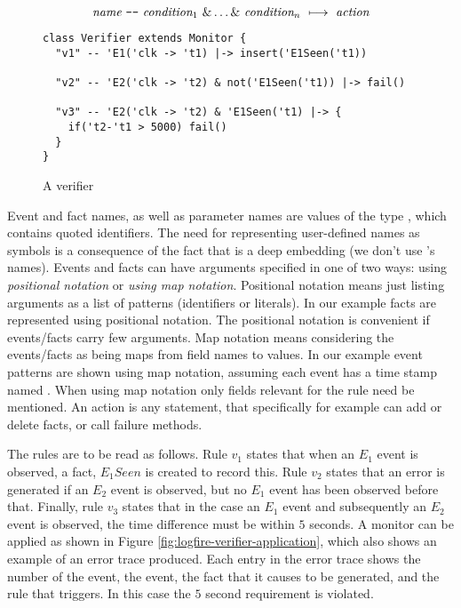 \[
  \textit{name}\ \verb+--+\ \textit{condition}_1\ \& \ldots \&\ \textit{condition}_n\ \longmapsto\  \textit{action}
\]

\begin{figure}[t]
\begin{small}
\begin{framed}
\sscala
\begin{lstlisting}
class Verifier extends Monitor {
  "v1" -- 'E1('clk -> 't1) |-> insert('E1Seen('t1))

  "v2" -- 'E2('clk -> 't2) & not('E1Seen('t1)) |-> fail()
  
  "v3" -- 'E2('clk -> 't2) & 'E1Seen('t1) |-> {
    if('t2-'t1 > 5000) fail()
  }
}
\end{lstlisting}
\end{framed}
\end{small}
\caption{A \logfire{} verifier}
\label{fig:logfire-verifier}
\end{figure}

Event and fact names, as well as parameter names are values of the
\scala{} type , which contains quoted identifiers.  The
need for representing user-defined names as symbols is a consequence
of the fact that \logfire{} is a deep embedding (we don't use
\scala{}'s names). 
%
Events and facts can have arguments specified in one of two ways:
using {\em positional notation} or {\em using map notation}\label{page:mapnotation}. 
Positional notation means
just listing arguments as a list of patterns (identifiers or literals). In our
example facts are represented using positional notation. 
The positional notation is convenient if events/facts carry few arguments. 
%
Map notation means considering the events/facts as being maps from field names to values. 
In our example event patterns are shown using map notation, assuming each event has a time stamp named . When using map notation only fields relevant for the rule need be mentioned. An action is any \scala{} statement, that specifically for example can add or delete facts, or call failure methods.

The rules are to be read as follows. Rule $v_1$ states that when an $E_1$ event
is observed, a fact, $E_1Seen$ is created to record this. Rule $v_2$ states that an error is generated if an $E_2$ event is observed, but no $E_1$ event has been observed before that. Finally, rule $v_3$ states that in the case an $E_1$ event and subsequently an $E_2$ event is observed, the time difference must be within $5$
seconds. 
%
A monitor can be applied as shown in Figure
\ref{fig:logfire-verifier-application}, which also shows an example of
an error trace produced.  Each entry in the error trace shows the
number of the event, the event, the fact that it causes to be
generated, and the rule that triggers. In this case the $5$ second requirement
is violated.

